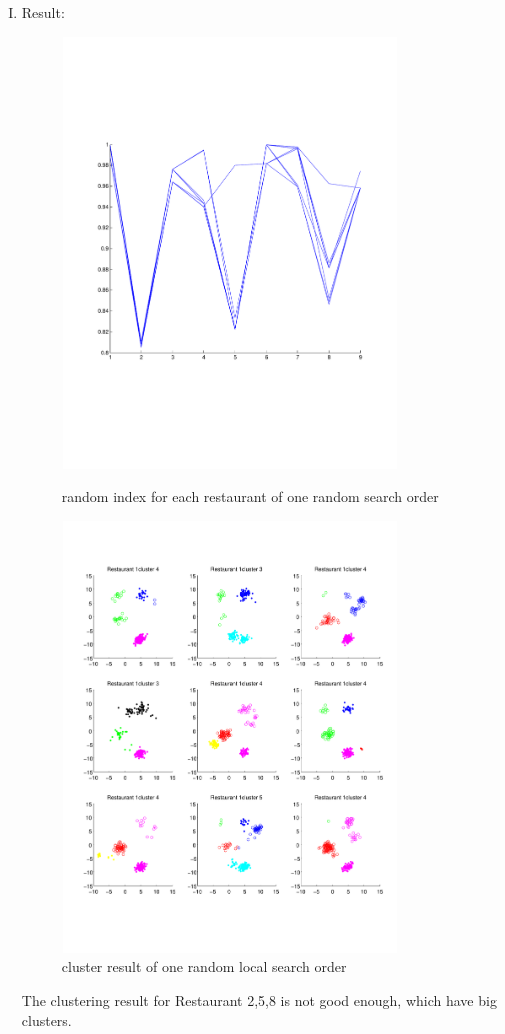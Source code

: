 \documentclass{article}
\begin{document}
\begin{spacing}{1.1}
\begin{enumerate}[(I)]
\begin{enumerate}[(a)]
\end{enumerate}
\item Result:\\
\begin{figure}[h] 
  \begin{minipage}[b]{0.5\textwidth} 
    \centering 
        \includegraphics[width=3.5in,height=4.5in]{rand_lo.pdf} 
    \caption{random index for each restaurant of one random search order} 
    \label{fig:by:table} 
  \end{minipage}%
  \begin{minipage}[b]{0.5\textwidth} 
    \centering 
    \includegraphics[width=3.5in,height=4.5in]{me_3.pdf} 
    \caption{cluster result of one random local search order}
    \label{fig:by:table}  
   \end{minipage}%
\end{figure}
The clustering result for Restaurant 2,5,8 is not good enough, which have big clusters.
\end{enumerate}


\end{spacing}
\end{document}
